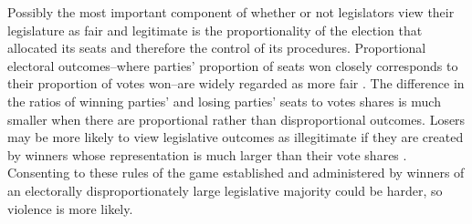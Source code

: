 \documentclass[a4paper]{article}\usepackage{graphicx, color}
\begin{document}
Possibly the most important component of whether or not legislators view their legislature as fair and legitimate is the proportionality of the election that allocated its seats and therefore the control of its procedures. Proportional electoral outcomes--where parties' proportion of seats won closely corresponds to their proportion of votes won--are widely regarded as more fair \citep{norris1997}. The difference in the ratios of winning parties' and losing parties' seats to votes shares is much smaller when there are proportional rather than disproportional outcomes. Losers may be more likely to view legislative outcomes as illegitimate if they are created by winners whose representation is much larger than their vote shares \citep[see][]{lijphart1999}. Consenting to these rules of the game established and administered by winners of an electorally disproportionately large legislative majority could be harder, so violence is more likely.
\end{document}
